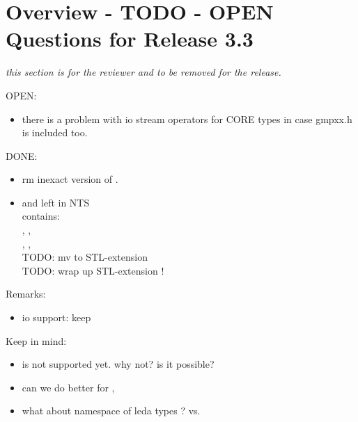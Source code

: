 \section{Overview - TODO - OPEN Questions for Release 3.3}

{\em this section is for the reviewer and to be removed for the release. }


OPEN:
\begin{itemize}
\item there is a problem with io stream operators for CORE types in case 
      gmpxx.h is included too. 
\end{itemize}


DONE:
\begin{itemize}
\item rm inexact version of . 
\item {} and  left in NTS\\
      contains: \\
      , , \\
      , , \\
      TODO: mv to STL-extension\\
      TODO: wrap up STL-extension ! 
\end{itemize}

Remarks:
\begin{itemize}
\item io support: keep  
\end{itemize}

Keep in mind: 
\begin{itemize}
\item {} is not supported yet. why not? is it possible?  
\item can we do better for , 
\item what about namespace of leda types ? 
      vs. 
\end{itemize}

